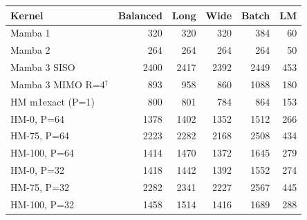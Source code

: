 \begin{tabular}{l r r r r r }
\toprule
Kernel & Balanced & Long & Wide & Batch & LM \\
\midrule
Mamba 1 & 320 & 320 & 320 & 384 & 60 \\
Mamba 2 & 264 & 264 & 264 & 264 & 50 \\
Mamba 3 SISO & 2400 & 2417 & 2392 & 2449 & 453 \\
Mamba 3 MIMO R=4$^\dagger$ & 893 & 958 & 860 & 1088 & 180 \\
\midrule
HM m1exact (P=1) & 800 & 801 & 784 & 864 & 153 \\
HM-0, P=64 & 1378 & 1402 & 1352 & 1512 & 266 \\
HM-75, P=64 & 2223 & 2282 & 2168 & 2508 & 434 \\
HM-100, P=64 & 1414 & 1470 & 1372 & 1645 & 279 \\
HM-0, P=32 & 1418 & 1442 & 1392 & 1552 & 274 \\
HM-75, P=32 & 2282 & 2341 & 2227 & 2567 & 445 \\
HM-100, P=32 & 1458 & 1514 & 1416 & 1689 & 288 \\
\bottomrule
\end{tabular}

